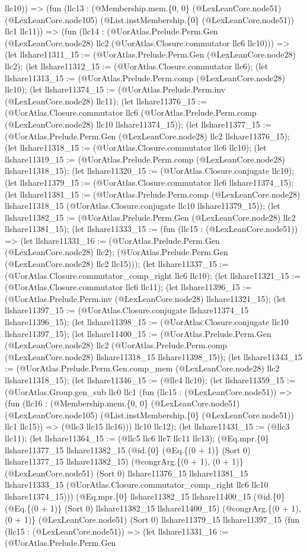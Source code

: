 \documentclass[11pt]{article}
\begin{document}
llc10)) => (fun (llc13 : (@Membership.mem.\{0, 0\} (@LexLeanCore.node51) (@LexLeanCore.node105) (@List.instMembership.\{0\} (@LexLeanCore.node51)) llc1 llc11)) => (fun (llc14 : (@UorAtlas.Prelude.Perm.Gen (@LexLeanCore.node28) llc2 (@UorAtlas.Closure.commutator llc6 llc10))) => (let llshare11311\_15 := (@UorAtlas.Prelude.Perm.Gen (@LexLeanCore.node28) llc2); (let llshare11312\_15 := (@UorAtlas.Closure.commutator llc6); (let llshare11313\_15 := (@UorAtlas.Prelude.Perm.comp (@LexLeanCore.node28) llc10); (let llshare11374\_15 := (@UorAtlas.Prelude.Perm.inv (@LexLeanCore.node28) llc11); (let llshare11376\_15 := (@UorAtlas.Closure.commutator llc6 (@UorAtlas.Prelude.Perm.comp (@LexLeanCore.node28) llc10 llshare11374\_15)); (let llshare11377\_15 := (@UorAtlas.Prelude.Perm.Gen (@LexLeanCore.node28) llc2 llshare11376\_15); (let llshare11318\_15 := (@UorAtlas.Closure.commutator llc6 llc10); (let llshare11319\_15 := (@UorAtlas.Prelude.Perm.comp (@LexLeanCore.node28) llshare11318\_15); (let llshare11320\_15 := (@UorAtlas.Closure.conjugate llc10); (let llshare11379\_15 := (@UorAtlas.Closure.commutator llc6 llshare11374\_15); (let llshare11381\_15 := (@UorAtlas.Prelude.Perm.comp (@LexLeanCore.node28) llshare11318\_15 (@UorAtlas.Closure.conjugate llc10 llshare11379\_15)); (let llshare11382\_15 := (@UorAtlas.Prelude.Perm.Gen (@LexLeanCore.node28) llc2 llshare11381\_15); (let llshare11333\_15 := (fun (llc15 : (@LexLeanCore.node51)) => (let llshare11331\_16 := (@UorAtlas.Prelude.Perm.Gen (@LexLeanCore.node28) llc2); (@UorAtlas.Prelude.Perm.Gen (@LexLeanCore.node28) llc2 llc15))); (let llshare11337\_15 := (@UorAtlas.Closure.commutator\_comp\_right llc6 llc10); (let llshare11321\_15 := (@UorAtlas.Closure.commutator llc6 llc11); (let llshare11396\_15 := (@UorAtlas.Prelude.Perm.inv (@LexLeanCore.node28) llshare11321\_15); (let llshare11397\_15 := (@UorAtlas.Closure.conjugate llshare11374\_15 llshare11396\_15); (let llshare11398\_15 := (@UorAtlas.Closure.conjugate llc10 llshare11397\_15); (let llshare11400\_15 := (@UorAtlas.Prelude.Perm.Gen (@LexLeanCore.node28) llc2 (@UorAtlas.Prelude.Perm.comp (@LexLeanCore.node28) llshare11318\_15 llshare11398\_15)); (let llshare11343\_15 := (@UorAtlas.Prelude.Perm.Gen.comp\_mem (@LexLeanCore.node28) llc2 llshare11318\_15); (let llshare11346\_15 := (@llc4 llc10); (let llshare11359\_15 := (@UorAtlas.Group.gen\_sub llc0 llc1 (fun (llc15 : (@LexLeanCore.node51)) => (fun (llc16 : (@Membership.mem.\{0, 0\} (@LexLeanCore.node51) (@LexLeanCore.node105) (@List.instMembership.\{0\} (@LexLeanCore.node51)) llc1 llc15)) => (@llc3 llc15 llc16))) llc10 llc12); (let llshare11431\_15 := (@llc3 llc11); (let llshare11364\_15 := (@llc5 llc6 llc7 llc11 llc13); (@Eq.mpr.\{0\} llshare11377\_15 llshare11382\_15 (@id.\{0\} (@Eq.\{(0 + 1)\} (Sort 0) llshare11377\_15 llshare11382\_15) (@congrArg.\{(0 + 1), (0 + 1)\} (@LexLeanCore.node51) (Sort 0) llshare11376\_15 llshare11381\_15 llshare11333\_15 (@UorAtlas.Closure.commutator\_comp\_right llc6 llc10 llshare11374\_15))) (@Eq.mpr.\{0\} llshare11382\_15 llshare11400\_15 (@id.\{0\} (@Eq.\{(0 + 1)\} (Sort 0) llshare11382\_15 llshare11400\_15) (@congrArg.\{(0 + 1), (0 + 1)\} (@LexLeanCore.node51) (Sort 0) llshare11379\_15 llshare11397\_15 (fun (llc15 : (@LexLeanCore.node51)) => (let llshare11331\_16 := (@UorAtlas.Prelude.Perm.Gen 
\end{document}
